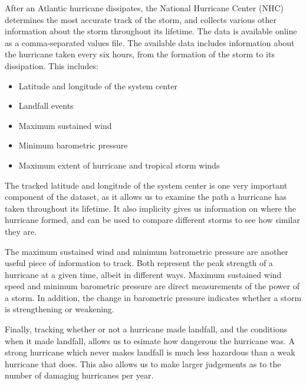 
\par
After an Atlantic hurricane dissipates, the National Hurricane Center (NHC) determines the most accurate track of the storm, and collects various other information about the storm throughout its lifetime.
The data is available online as a comma-separated values file.
The available data includes information about the hurricane taken every six hours, from the formation of the storm to its dissipation.
This includes:
\begin{itemize}
	\item Latitude and longitude of the system center
	\item Landfall events
	\item Maximum sustained wind
	\item Minimum barometric pressure
	\item Maximum extent of hurricane and tropical storm winds
\end{itemize}

\par
The tracked latitude and longitude of the system center is one very important component of the dataset, as it allows us to examine the path a hurricane has taken throughout its lifetime.
It also implicity gives us information on where the hurricane formed, and can be used to compare different storms to see how similar they are.

\par
The maximum sustained wind and minimum batrometric pressure are another useful piece of information to track.
Both represent the peak strength of a hurricane at a given time, albeit in different ways.
Maximum sustained wind speed and minimum barometric pressure are direct measurements of the power of a storm.
In addition, the change in barometric pressure indicates whether a storm is strengthening or weakening.

\par
Finally, tracking whether or not a hurricane made landfall, and the conditions when it made landfall, allows us to esimate how dangerous the hurricane was.
A strong hurricane which never makes landfall is much less hazardous than a weak hurricane that does.
This also allows us to make larger judgements as to the number of damaging hurricanes per year.

